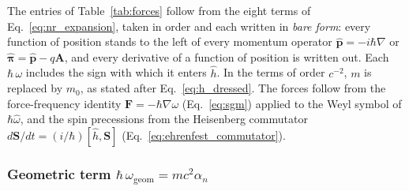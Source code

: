 \documentclass[aps,prd,onecolumn,tightenlines,nofootinbib,notitlepage,11pt,floatfix]{revtex4-2}
\theoremstyle{indentedtheorem}
\begin{document}
The entries of Table~\ref{tab:forces} follow from the eight terms of Eq.~\eqref{eq:nr_expansion}, taken in order and each written in \emph{bare form}: every function of position stands to the left of every momentum operator $\hat{\mathbf{p}}=-i\hbar\nabla$ or $\hat{\boldsymbol{\pi}}=\hat{\mathbf{p}}-q\mathbf{A}$, and every derivative of a function of position is written out. Each $\hbar\,\omega$ includes the sign with which it enters $\hat{h}$. In the terms of order $c^{-2}$, $m$ is replaced by $m_0$, as stated after Eq.~\eqref{eq:h_dressed}. The forces follow from the force-frequency identity $\mathbf{F}=-\hbar\nabla\omega$ (Eq.~\eqref{eq:sgm}) applied to the Weyl symbol of $\hbar\hat{\omega}$, and the spin precessions from the Heisenberg commutator $d\mathbf{S}/dt=(i/\hbar)[\hat{h},\mathbf{S}]$ (Eq.~\eqref{eq:ehrenfest_commutator}).

\subsubsection{Geometric term \texorpdfstring{$\hbar\,\omega_\text{geom}=mc^2\alpha_n$}{hbar omega geom}}
\label{sec:term_geom}
\end{document}

